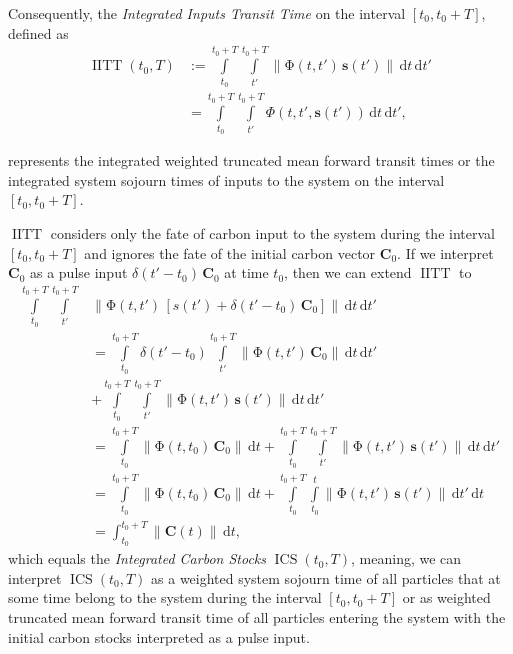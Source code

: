 \documentclass[ProofPDF]{./Styles/Jnls-Template-V3}
\newcommand{\IITT}{\operatorname{IITT}}
\newcommand{\ICS}{\operatorname{ICS}}
\newcommand{\intl}{\int\limits}
\newcommand{\dd}[1]{\,\mathrm{d}#1}
\renewcommand{\vec}[1]{\mathbf{#1}}
\newcommand{\tens}[1]{\mathrm{#1}}
\newcommand{\itPhi}{\mathit{\Phi}}
\newcommand{\vnorm}[1]{\left\|#1\right\|}
\begin{document}
Consequently, the \emph{Integrated Inputs Transit Time} on the interval $[t_0, t_0+T]$, defined as
\begin{equation}
    \label{eqn:IITT}
    \begin{aligned}
        \IITT(t_0, T) &:= \intl_{t_0}^{t_0+T} \intl_{t'}^{t_0+T} \vnorm{\tens{\Phi}(t,t')\,\vec{s}(t')}\dd{t}\dd{t'} \\
        & = \intl_{t_0}^{t_0+T} \intl_{t'}^{t_0+T} \itPhi(t,t',\vec{s}(t'))\dd{t}\dd{t'},
    \end{aligned}
\end{equation}


represents the integrated weighted truncated mean forward transit times or the integrated system sojourn times of inputs to the system on the interval $[t_0, t_0+T]$.

$\IITT$ considers only the fate of carbon input to the system during the interval $[t_0,t_0+T]$ and ignores the fate of the initial carbon vector $\vec{C}_0$.
If we interpret $\vec{C}_0$ as a pulse input $\delta(t'-t_0)\,\vec{C}_0$ at time $t_0$, then we can extend $\IITT$ to
\begin{equation}
    \label{eqn:ICS}
    \begin{aligned}
        \intl_{t_0}^{t_0+T} \intl_{t'}^{t_0+T} &\vnorm{\tens{\Phi}(t,t')\,\left[s(t')+ \delta(t'-t_0)\,\vec{C}_0\right]}\dd{t}\dd{t'} \\
        &=\intl_{t_0}^{t_0+T} \delta(t'-t_0) \intl_{t'}^{t_0+T}\vnorm{\tens{\Phi}(t,t')\,\vec{C}_0}\dd{t}\dd{t'} \\
        &+ \intl_{t_0}^{t_0+T}\intl_{t'}^{t_0+T}\vnorm{\tens{\Phi}(t,t')\,\vec{s}(t')}\dd{t}\dd{t'}\\
        &= \intl_{t_0}^{t_0+T}\vnorm{\tens{\Phi}(t,t_0)\,\vec{C}_0}\dd{t} +\intl_{t_0}^{t_0+T}\intl_{t'}^{t_0+T}\vnorm{\tens{\Phi}(t,t')\,\vec{s}(t')}\dd{t}\dd{t'}\\
        & = \intl_{t_0}^{t_0+T}\vnorm{\tens{\Phi}(t,t_0)\,\vec{C}_0}\dd{t} + \intl_{t_0}^{t_0+T} \intl_{t_0}^t \vnorm{\tens{\Phi}(t,t')\,\vec{s}(t')}\dd{t'}\dd{t}\\
        &= \int_{t_0}^{t_0+T} \vnorm{\vec{C}(t)}\dd{t},
    \end{aligned}
\end{equation}
which equals the \emph{Integrated Carbon Stocks} $\ICS(t_0,T)$, meaning, we can interpret $\ICS(t_0, T)$ as a weighted system sojourn time of all particles that at some time belong to the system during the interval $[t_0,t_0+T]$ or as weighted truncated mean forward transit time of all particles entering the system with the initial carbon stocks interpreted as a pulse input.
\end{document}

